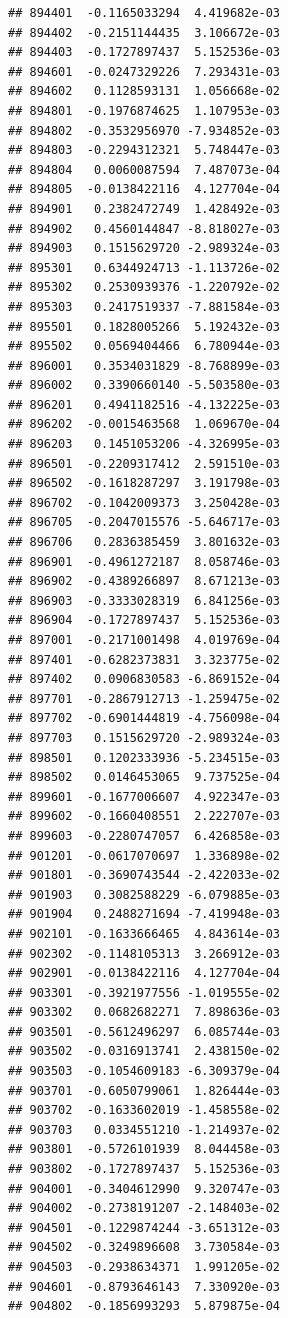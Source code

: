 \begin{frame}[fragile]
\begin{verbatim}
## 894401  -0.1165033294  4.419682e-03
## 894402  -0.2151144435  3.106672e-03
## 894403  -0.1727897437  5.152536e-03
## 894601  -0.0247329226  7.293431e-03
## 894602   0.1128593131  1.056668e-02
## 894801  -0.1976874625  1.107953e-03
## 894802  -0.3532956970 -7.934852e-03
## 894803  -0.2294312321  5.748447e-03
## 894804   0.0060087594  7.487073e-04
## 894805  -0.0138422116  4.127704e-04
## 894901   0.2382472749  1.428492e-03
## 894902   0.4560144847 -8.818027e-03
## 894903   0.1515629720 -2.989324e-03
## 895301   0.6344924713 -1.113726e-02
## 895302   0.2530939376 -1.220792e-02
## 895303   0.2417519337 -7.881584e-03
## 895501   0.1828005266  5.192432e-03
## 895502   0.0569404466  6.780944e-03
## 896001   0.3534031829 -8.768899e-03
## 896002   0.3390660140 -5.503580e-03
## 896201   0.4941182516 -4.132225e-03
## 896202  -0.0015463568  1.069670e-04
## 896203   0.1451053206 -4.326995e-03
## 896501  -0.2209317412  2.591510e-03
## 896502  -0.1618287297  3.191798e-03
## 896702  -0.1042009373  3.250428e-03
## 896705  -0.2047015576 -5.646717e-03
## 896706   0.2836385459  3.801632e-03
## 896901  -0.4961272187  8.058746e-03
## 896902  -0.4389266897  8.671213e-03
## 896903  -0.3333028319  6.841256e-03
## 896904  -0.1727897437  5.152536e-03
## 897001  -0.2171001498  4.019769e-04
## 897401  -0.6282373831  3.323775e-02
## 897402   0.0906830583 -6.869152e-04
## 897701  -0.2867912713 -1.259475e-02
## 897702  -0.6901444819 -4.756098e-04
## 897703   0.1515629720 -2.989324e-03
## 898501   0.1202333936 -5.234515e-03
## 898502   0.0146453065  9.737525e-04
## 899601  -0.1677006607  4.922347e-03
## 899602  -0.1660408551  2.222707e-03
## 899603  -0.2280747057  6.426858e-03
## 901201  -0.0617070697  1.336898e-02
## 901801  -0.3690743544 -2.422033e-02
## 901903   0.3082588229 -6.079885e-03
## 901904   0.2488271694 -7.419948e-03
## 902101  -0.1633666465  4.843614e-03
## 902302  -0.1148105313  3.266912e-03
## 902901  -0.0138422116  4.127704e-04
## 903301  -0.3921977556 -1.019555e-02
## 903302   0.0682682271  7.898636e-03
## 903501  -0.5612496297  6.085744e-03
## 903502  -0.0316913741  2.438150e-02
## 903503  -0.1054609183 -6.309379e-04
## 903701  -0.6050799061  1.826444e-03
## 903702  -0.1633602019 -1.458558e-02
## 903703   0.0334551210 -1.214937e-02
## 903801  -0.5726101939  8.044458e-03
## 903802  -0.1727897437  5.152536e-03
## 904001  -0.3404612990  9.320747e-03
## 904002  -0.2738191207 -2.148403e-02
## 904501  -0.1229874244 -3.651312e-03
## 904502  -0.3249896608  3.730584e-03
## 904503  -0.2938634371  1.991205e-02
## 904601  -0.8793646143  7.330920e-03
## 904802  -0.1856993293  5.879875e-04

\end{verbatim}
\end{frame}
